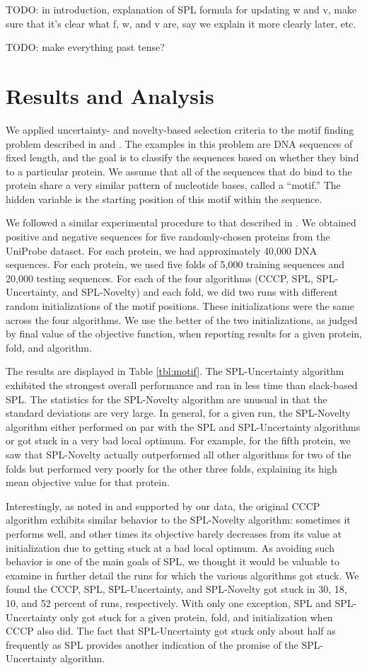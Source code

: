 \documentclass{article}
\newcommand{\mysection}[1]{\vspace{-4mm}\section{#1}\vspace{-4mm}}
\begin{document}
TODO: in introduction, explanation of SPL formula for updating w and v, make sure that it's clear what f, w, and v are, say we explain it more clearly later, etc.

TODO: make everything past tense?

\mysection{Results and Analysis}
\label{sec:results}

We applied uncertainty- and novelty-based selection criteria to the motif finding problem described in \cite{SPL} and \cite{SSVM}. The examples in this problem are DNA sequences of fixed length, and the goal is to classify the sequences based on whether they bind to a particular protein. We assume that all of the sequences that do bind to the protein share a very similar pattern of nucleotide bases, called a ``motif.'' The hidden variable is the starting position of this motif within the sequence.

We followed a similar experimental procedure to that described in \cite{SPL}. We obtained positive and negative sequences for five randomly-chosen proteins from the UniProbe dataset. For each protein, we had approximately 40,000 DNA sequences. For each protein, we used five folds of 5,000 training sequences and 20,000 testing sequences. For each of the four algorithms (CCCP, SPL, SPL-Uncertainty, and SPL-Novelty) and each fold, we did two runs with different random initializations of the motif positions. These initializations were the same across the four algorithms. We use the better of the two initializations, as judged by final value of the objective function, when reporting results for a given protein, fold, and algorithm. 

The results are displayed in Table \ref{tbl:motif}. The SPL-Uncertainty algorithm exhibited the strongest overall performance and ran in less time than slack-based SPL. The statistics for the SPL-Novelty algorithm are unusual in that the standard deviations are very large. In general, for a given run, the SPL-Novelty algorithm either performed on par with the SPL and SPL-Uncertainty algorithms or got stuck in a very bad local optimum. For example, for the fifth protein, we saw that SPL-Novelty actually outperformed all other algorithms for two of the folds but performed very poorly for the other three folds, explaining its high mean objective value for that protein. 

Interestingly, as noted in \cite{SPL} and supported by our data, the original CCCP algorithm exhibits similar behavior to the SPL-Novelty algorithm: sometimes it performs well, and other times its objective barely decreases from its value at initialization due to getting stuck at a bad local optimum. As avoiding such behavior is one of the main goals of SPL, we thought it would be valuable to examine in further detail the runs for which the various algorithms got stuck. We found the CCCP, SPL, SPL-Uncertainty, and SPL-Novelty got stuck in 30, 18, 10, and 52 percent of runs, respectively. With only one exception, SPL and SPL-Uncertainty only got stuck for a given protein, fold, and initialization when CCCP also did. The fact that SPL-Uncertainty got stuck only about half as frequently as SPL provides another indication of the promise of the SPL-Uncertainty algorithm. 
\end{document}
